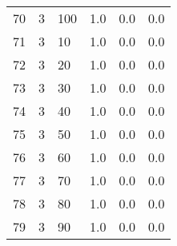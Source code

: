 \documentclass{article}
\begin{document}
\begin{center}
\begin{tabular}{llllll}
70 &         3 &        100 &              1.0 &                       0.0 &                                   0.0 \\
71 &         3 &         10 &              1.0 &                       0.0 &                                   0.0 \\
72 &         3 &         20 &              1.0 &                       0.0 &                                   0.0 \\
73 &         3 &         30 &              1.0 &                       0.0 &                                   0.0 \\
74 &         3 &         40 &              1.0 &                       0.0 &                                   0.0 \\
75 &         3 &         50 &              1.0 &                       0.0 &                                   0.0 \\
76 &         3 &         60 &              1.0 &                       0.0 &                                   0.0 \\
77 &         3 &         70 &              1.0 &                       0.0 &                                   0.0 \\
78 &         3 &         80 &              1.0 &                       0.0 &                                   0.0 \\
79 &         3 &         90 &              1.0 &                       0.0 &                                   0.0 \\
\bottomrule
\end{tabular}
\end{center}
\newpage
\end{document}
